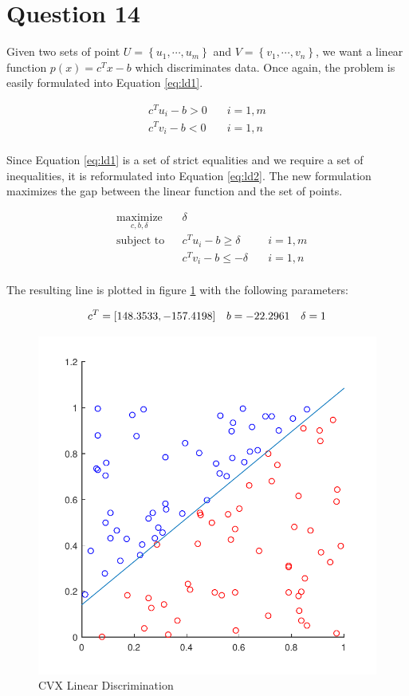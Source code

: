 \documentclass[letterpaper,12pt,]{article}
\begin{document}
\section*{Question 14}

Given two sets of point $U = \left\{u_1,\cdots,u_m\right\}$ and $V = \left\{v_1,\cdots,v_n\right\}$, we want a linear function $p(x) = c^T x -b$ which discriminates data. Once again, the problem is easily formulated into Equation \ref{eq:ld1}. 

\begin{equation}
\begin{aligned}
	 c^T u_i - b > 0 \quad & i=1,m\\
	 c^T v_i - b < 0 \quad & i=1,n\\
\end{aligned}
\label{eq:ld1}
\end{equation}

Since Equation \ref{eq:ld1} is a set of strict equalities and we require a set of inequalities, it is reformulated into Equation \ref{eq:ld2}. The new formulation maximizes the gap between the linear function and the set of points.

\begin{equation}
\begin{aligned}
& \underset{c,b,\delta}{\text{maximize}}
& & \delta \\
& \text{subject to}
& &	 c^T u_i - b \geq \delta \quad & i=1,m\\
&& &	 c^T v_i - b \leq -\delta \quad & i=1,n\\
\end{aligned}
\label{eq:ld2}
\end{equation}

The resulting line is plotted in figure \ref{fig:ld} with the following parameters:

\begin{equation*}
c^T = [148.3533, -157.4198] \quad b =-22.2961 \quad \delta = 1\\
\label{eq:ld3}
\end{equation*}

\begin{figure}[h]
    \centering
    \includegraphics[height=0.35\textheight]{ld1}
    \caption{CVX Linear Discrimination}
    \label{fig:ld}
\end{figure}
\end{document}
